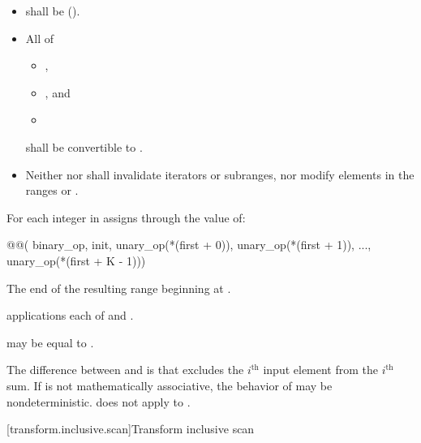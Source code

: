 \begin{itemdescr}
\pnum
\requires
\begin{itemize}
\item
   shall be  ().
\item
  All of
  \begin{itemize}
  \item {},
  \item {}, and
  \item {}
  \end{itemize}
  shall be convertible to .
\item
  Neither  nor  shall
  invalidate iterators or subranges, nor modify elements in
  the ranges  or .
\end{itemize}

\pnum
\effects
For each integer  in 
assigns through  the value of:
\begin{codeblock}
@@(
    binary_op, init,
    unary_op(*(first + 0)), unary_op(*(first + 1)), ..., unary_op(*(first + K - 1)))
\end{codeblock}

\pnum
\returns
The end of the resulting range beginning at .

\pnum
\complexity
{} applications each
of  and .

\pnum
\remarks
{} may be equal to .

\pnum
\begin{note}
The difference between  and
 is that 
excludes the $i^\text{th}$ input element from the $i^\text{th}$ sum.
If  is not mathematically associative,
the behavior of  may be nondeterministic.
does not apply  to .
\end{note}
\end{itemdescr}

[transform.inclusive.scan]{Transform inclusive scan}

